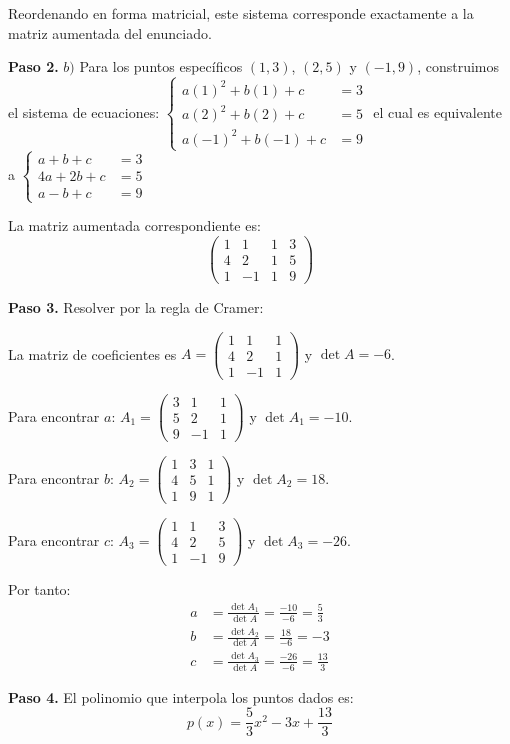 \begin{example}
\begin{myproof}
Reordenando en forma matricial, este sistema corresponde exactamente a la matriz aumentada del enunciado.

\textbf{Paso 2.} $b)$ Para los puntos específicos $(1,3)$, $(2,5)$ y $(-1,9)$, construimos el sistema de ecuaciones: $\begin{cases}
a(1)^2 + b(1) + c &= 3\\
a(2)^2 + b(2) + c &= 5\\
a(-1)^2 + b(-1) + c &= 9
\end{cases}$ 
el cual es equivalente a $\begin{cases}
a + b + c &= 3\\
4a + 2b + c &= 5\\
a - b + c &= 9
\end{cases}$

La matriz aumentada correspondiente es:
\[ \left( \begin{array}{ccc|c} 
1 & 1 & 1 & 3\\
4 & 2 & 1 & 5\\
1 & -1 & 1 & 9
\end{array} \right) \]

\textbf{Paso 3.} Resolver por la regla de Cramer:

La matriz de coeficientes es $A=\begin{pmatrix}
1 & 1 & 1 \\
4 & 2 & 1 \\
1 & -1 & 1
\end{pmatrix}$ y $\det A = -6$.

Para encontrar $a$: $A_1=\begin{pmatrix}
3 & 1 & 1 \\
5 & 2 & 1 \\
9 & -1 & 1
\end{pmatrix}$ y $\det A_1 = -10$.

Para encontrar $b$: $A_2=\begin{pmatrix}
1 & 3 & 1 \\
4 & 5 & 1 \\
1 & 9 & 1
\end{pmatrix}$ y $\det A_2 = 18$.

Para encontrar $c$: $A_3=\begin{pmatrix}
1 & 1 & 3 \\
4 & 2 & 5 \\
1 & -1 & 9
\end{pmatrix}$ y $\det A_3 = -26$.

Por tanto:
\begin{align*}
a &= \frac{\det A_1}{\det A} = \frac{-10}{-6} = \frac{5}{3}\\
b &= \frac{\det A_2}{\det A} = \frac{18}{-6} = -3\\
c &= \frac{\det A_3}{\det A} = \frac{-26}{-6} = \frac{13}{3}
\end{align*}

\textbf{Paso 4.} El polinomio que interpola los puntos dados es:
\[ \boxed{p(x) = \frac{5}{3}x^2 - 3x + \frac{13}{3}} \]
\end{myproof}
\end{example}


